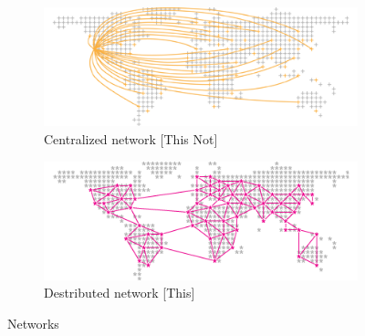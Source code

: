 \begin{figure}[H]
        \centering
        \begin{subfigure}[b]{0.7\textwidth}
                \centering
                \includegraphics[width=\textwidth]{network-centralized.png}
                \caption{Centralized network [This Not]}
                \label{fig:Centralized network}
        \end{subfigure}
      
         \begin{subfigure}[b]{0.7\textwidth}
                \centering
                \includegraphics[width=\textwidth]{network-distributed.png}
                \caption{Destributed network [This]}
                \label{fig:Destributed network}
        \end{subfigure}
        \caption{Networks}\label{fig:Networks}
\end{figure}

